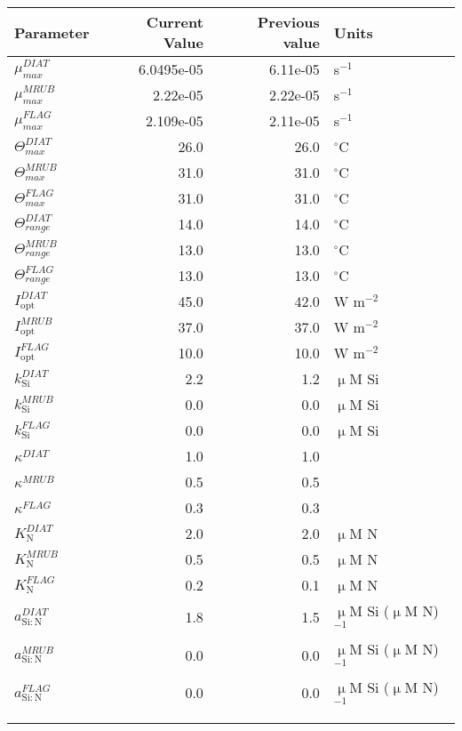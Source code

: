    \small
   \centering
   \begin{tabular}{lrrl}\toprule
    Parameter & Current Value & Previous value & Units \\ \midrule
     $\mu^{DIAT}_{max}$ & 6.0495e-05 & 6.11e-05 & s$^{-1}$ \\
     $\mu^{MRUB}_{max}$ & 2.22e-05 & 2.22e-05 & s$^{-1}$ \\
     $\mu^{FLAG}_{max}$ & 2.109e-05 & 2.11e-05 & s$^{-1}$ \\
     $\Theta_{max}^{DIAT}$ & 26.0 & 26.0 & $^{\circ}$C \\
     $\Theta_{max}^{MRUB}$ & 31.0 & 31.0 & $^{\circ}$C \\
     $\Theta_{max}^{FLAG}$ & 31.0 & 31.0 & $^{\circ}$C \\
     $\Theta_{range}^{DIAT}$ & 14.0 & 14.0 & $^{\circ}$C \\
     $\Theta_{range}^{MRUB}$ & 13.0 & 13.0 & $^{\circ}$C \\
     $\Theta_{range}^{FLAG}$ & 13.0 & 13.0 & $^{\circ}$C \\
     $I_{\text{opt}}^{DIAT}$ & 45.0 & 42.0 & W m$^{-2}$ \\
     $I_{\text{opt}}^{MRUB}$ & 37.0 & 37.0 & W m$^{-2}$ \\
     $I_{\text{opt}}^{FLAG}$ & 10.0 & 10.0 & W m$^{-2}$ \\
     $k_\mathrm{Si}^{DIAT}$ & 2.2 & 1.2 & $\upmu$M Si \\
     $k_\mathrm{Si}^{MRUB}$ & 0.0 & 0.0 & $\upmu$M Si \\
     $k_\mathrm{Si}^{FLAG}$ & 0.0 & 0.0 & $\upmu$M Si \\
     $\kappa^{DIAT}$ & 1.0 & 1.0 &  \\
     $\kappa^{MRUB}$ & 0.5 & 0.5 &  \\
     $\kappa^{FLAG}$ & 0.3 & 0.3 &  \\
     $K_\mathrm{N}^{DIAT}$ & 2.0 & 2.0 & $\upmu$M N \\
     $K_\mathrm{N}^{MRUB}$ & 0.5 & 0.5 & $\upmu$M N \\
     $K_\mathrm{N}^{FLAG}$ & 0.2 & 0.1 & $\upmu$M N \\
     $a_{\mathrm{Si:N}}^{DIAT}$ & 1.8 & 1.5 & $\upmu$M Si ($\upmu$M N)$^{-1}$ \\
     $a_{\mathrm{Si:N}}^{MRUB}$ & 0.0 & 0.0 & $\upmu$M Si ($\upmu$M N)$^{-1}$ \\
     $a_{\mathrm{Si:N}}^{FLAG}$ & 0.0 & 0.0 & $\upmu$M Si ($\upmu$M N)$^{-1}$ \\
   \midrule
 \\ \\   \end{tabular}
